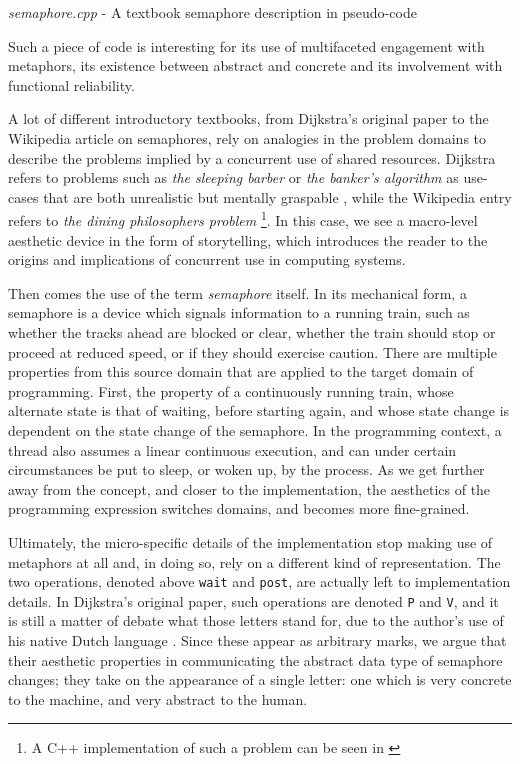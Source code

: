 \begin{listing}
  \inputminted{cpp}{./corpus/semaphore.cpp}
  \caption{\emph{semaphore.cpp} - A textbook semaphore description in pseudo-code \citep{arpaci_ostep_2018}}
  \label{code:semaphore-pseudocode}
\end{listing}

Such a piece of code is interesting for its use of multifaceted engagement with metaphors, its existence between abstract and concrete and its involvement with functional reliability.

A lot of different introductory textbooks, from Dijkstra's original paper to the Wikipedia article on semaphores, rely on analogies in the problem domains to describe the problems implied by a concurrent use of shared resources. Dijkstra refers to problems such as \emph{the sleeping barber} or \emph{the banker's algorithm} as use-cases that are both unrealistic but mentally graspable \citep{dijkstra_cooperating_1965}, while the Wikipedia entry refers to \emph{the dining philosophers problem} \citep{wikipedia_semaphore_2023}\footnote{A C++ implementation of such a problem can be seen in \citep{arpaci-dusseau_ostepcode_2023}}. In this case, we see a macro-level aesthetic device in the form of storytelling, which introduces the reader to the origins and implications of concurrent use in computing systems.

Then comes the use of the term \emph{semaphore} itself. In its mechanical form, a semaphore is a device which signals information to a running train, such as whether the tracks ahead are blocked or clear, whether the train should stop or proceed at reduced speed, or if they should exercise caution. There are multiple properties from this source domain that are applied to the target domain of programming. First, the property of a continuously running train, whose alternate state is that of waiting, before starting again, and whose state change is dependent on the state change of the semaphore. In the programming context, a thread also assumes a linear continuous execution, and can under certain circumstances be put to sleep, or woken up, by the process. As we get further away from the concept, and closer to the implementation, the aesthetics of the programming expression switches domains, and becomes more fine-grained.

Ultimately, the micro-specific details of the implementation stop making use of metaphors at all and, in doing so, rely on a different kind of representation. The two operations, denoted above \lstinline{wait} and \lstinline{post}, are actually left to implementation details. In Dijkstra's original paper, such operations are denoted \lstinline{P} and \lstinline{V}, and it is still a matter of debate what those letters stand for, due to the author's use of his native Dutch language \citep{wikipedia_semaphore_2023}. Since these appear as arbitrary marks, we argue that their aesthetic properties in communicating the abstract data type of semaphore changes; they take on the appearance of a single letter: one which is very concrete to the machine, and very abstract to the human.

